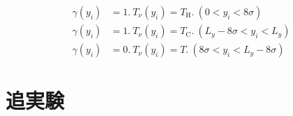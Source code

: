 \documentclass[dvipdfmx]{jsarticle}
\numberwithin{equation}{subsection}
\begin{document}
\begin{align}
  \gamma(y_i) &= 1. \ T_{\nu}(y_i) = T_{\text{H}}. \ (0 < y_i < 8\sigma) \\
  \gamma(y_i) &= 1. \ T_{\nu}(y_i) = T_{\text{C}}. \ (L_y - 8\sigma < y_i < L_y) \\
  \gamma(y_i) &= 0. \ T_{\nu}(y_i) = T. \ (8\sigma < y_i < L_y - 8\sigma)
\end{align}















\newpage

\section{追実験}
\end{document}
